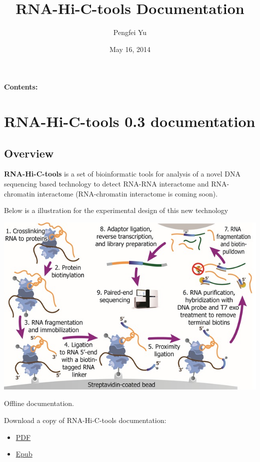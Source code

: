 \documentclass[letterpaper,10pt,english]{sphinxmanual}
\title{RNA-Hi-C-tools Documentation}
\date{May 16, 2014}
\author{Pengfei Yu}
\begin{document}
\maketitle
\tableofcontents
{}\label{index::doc}


\textbf{Contents:}


\chapter{RNA-Hi-C-tools 0.3 documentation}
\label{RNA-Hi-C-tools:welcome-to-rna-hi-c-tools-s-documentation}\label{RNA-Hi-C-tools::doc}\label{RNA-Hi-C-tools:rna-hi-c-tools-version-documentation}

\section{Overview}
\label{RNA-Hi-C-tools:overview}
\textbf{RNA-Hi-C-tools} is a set of bioinformatic tools for analysis of a novel DNA sequencing based technology to detect RNA-RNA interactome and RNA-chromatin interactome (RNA-chromatin interactome is coming soon).

Below is a illustration for the experimental design of this new technology

{\hfill\includegraphics{exp.jpg}\hfill}




Offline documentation.

Download a copy of RNA-Hi-C-tools documentation:
\begin{itemize}
\item {} 
\href{http://systemsbio.ucsd.edu/RNA-Hi-C/\_sources/Stitch-seq-tools.pdf}{PDF}

\item {} 
\href{https://media.readthedocs.org/epub/stitch-seq-tools/latest/stitch-seq-tools.epub}{Epub}

\end{itemize}
\end{document}
